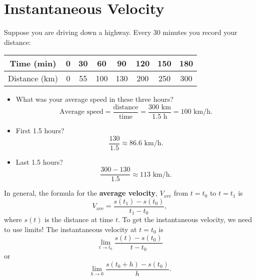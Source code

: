 \section{Instantaneous Velocity}
Suppose you are driving down a highway. Every 30 minutes you record your distance:
\begin{center}
    \begin{tabular}{cccccccc}
        Time (min)    & 0 & 30 & 60  & 90  & 120 & 150 & 180 \\
        \midrule
        Distance (km) & 0 & 55 & 100 & 130 & 200 & 250 & 300
    \end{tabular}
\end{center}
\begin{itemize}
    \item What was your average speed in these three hours?
          \[ \text{Average speed}=\frac{\text{distance}}{\text{time}}=\frac{300\text{ km}}{1.5\text{ h}}=100\text{ km/h}. \]
    \item First 1.5 hours?
          \[ \frac{130}{1.5}\approx 86.6\text{ km/h}. \]
    \item Last 1.5 hours?
          \[ \frac{300-130}{1.5}\approx 113\text{ km/h}. \]
\end{itemize}
In general, the formula for the \textbf{average velocity}, $ V_{\text{ave}} $ from $ t=t_0 $ to $ t=t_1 $ is
\[ V_{\text{ave}}=\frac{s(t_1)-s(t_0)}{t_1-t_0}, \]
where $ s(t) $ is the distance at time $ t $. To get the instantaneous velocity, we need to use limits!
The instantaneous velocity at $ t=t_0 $ is
\[ \lim\limits_{{t} \to {t_0}}\frac{s(t)-s(t_0)}{t-t_0} \]
or
\[ \lim\limits_{{h} \to {0}}\frac{s(t_0+h)-s(t_0)}{h}. \]
